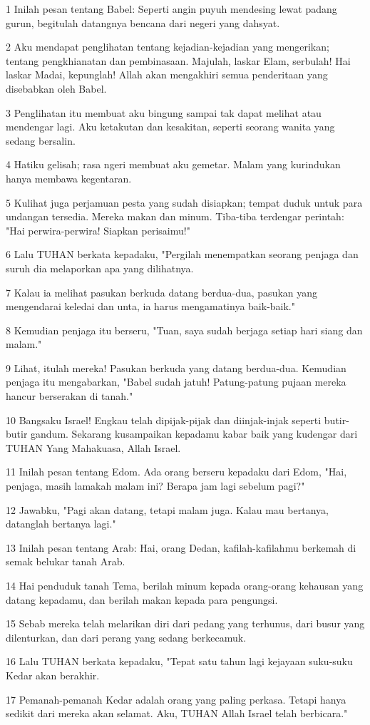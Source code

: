 \par 1 Inilah pesan tentang Babel: Seperti angin puyuh mendesing lewat padang gurun, begitulah datangnya bencana dari negeri yang dahsyat.
\par 2 Aku mendapat penglihatan tentang kejadian-kejadian yang mengerikan; tentang pengkhianatan dan pembinasaan. Majulah, laskar Elam, serbulah! Hai laskar Madai, kepunglah! Allah akan mengakhiri semua penderitaan yang disebabkan oleh Babel.
\par 3 Penglihatan itu membuat aku bingung sampai tak dapat melihat atau mendengar lagi. Aku ketakutan dan kesakitan, seperti seorang wanita yang sedang bersalin.
\par 4 Hatiku gelisah; rasa ngeri membuat aku gemetar. Malam yang kurindukan hanya membawa kegentaran.
\par 5 Kulihat juga perjamuan pesta yang sudah disiapkan; tempat duduk untuk para undangan tersedia. Mereka makan dan minum. Tiba-tiba terdengar perintah: "Hai perwira-perwira! Siapkan perisaimu!"
\par 6 Lalu TUHAN berkata kepadaku, "Pergilah menempatkan seorang penjaga dan suruh dia melaporkan apa yang dilihatnya.
\par 7 Kalau ia melihat pasukan berkuda datang berdua-dua, pasukan yang mengendarai keledai dan unta, ia harus mengamatinya baik-baik."
\par 8 Kemudian penjaga itu berseru, "Tuan, saya sudah berjaga setiap hari siang dan malam."
\par 9 Lihat, itulah mereka! Pasukan berkuda yang datang berdua-dua. Kemudian penjaga itu mengabarkan, "Babel sudah jatuh! Patung-patung pujaan mereka hancur berserakan di tanah."
\par 10 Bangsaku Israel! Engkau telah dipijak-pijak dan diinjak-injak seperti butir-butir gandum. Sekarang kusampaikan kepadamu kabar baik yang kudengar dari TUHAN Yang Mahakuasa, Allah Israel.
\par 11 Inilah pesan tentang Edom. Ada orang berseru kepadaku dari Edom, "Hai, penjaga, masih lamakah malam ini? Berapa jam lagi sebelum pagi?"
\par 12 Jawabku, "Pagi akan datang, tetapi malam juga. Kalau mau bertanya, datanglah bertanya lagi."
\par 13 Inilah pesan tentang Arab: Hai, orang Dedan, kafilah-kafilahmu berkemah di semak belukar tanah Arab.
\par 14 Hai penduduk tanah Tema, berilah minum kepada orang-orang kehausan yang datang kepadamu, dan berilah makan kepada para pengungsi.
\par 15 Sebab mereka telah melarikan diri dari pedang yang terhunus, dari busur yang dilenturkan, dan dari perang yang sedang berkecamuk.
\par 16 Lalu TUHAN berkata kepadaku, "Tepat satu tahun lagi kejayaan suku-suku Kedar akan berakhir.
\par 17 Pemanah-pemanah Kedar adalah orang yang paling perkasa. Tetapi hanya sedikit dari mereka akan selamat. Aku, TUHAN Allah Israel telah berbicara."

